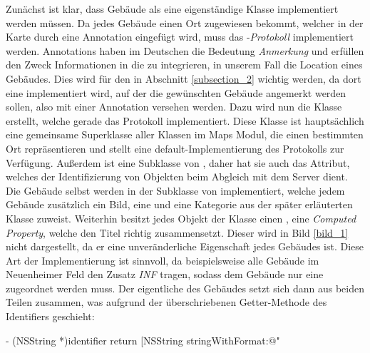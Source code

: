 \documentclass{report}
\begin{document}
Zunächst ist klar, dass Gebäude als eine eigenständige Klasse implementiert werden müssen. Da jedes Gebäude einen Ort zugewiesen bekommt, welcher in der Karte durch eine Annotation eingefügt wird, muss das -\emph{Protokoll} implementiert werden. Annotations haben im Deutschen die Bedeutung \emph{Anmerkung} und erfüllen den Zweck Informationen in die  zu integrieren, in unserem Fall die Location eines Gebäudes. Dies wird für den  in Abschnitt \ref{subsection_2} wichtig werden, da dort eine  implementiert wird, auf der die gewünschten Gebäude angemerkt werden sollen, also mit einer Annotation versehen werden. Dazu wird nun die Klasse  erstellt, welche gerade das  Protokoll implementiert. Diese Klasse ist hauptsächlich eine gemeinsame Superklasse aller Klassen im Maps Modul, die einen bestimmten Ort repräsentieren und stellt eine default-Implementierung des  Protokolls zur Verfügung. Außerdem ist  eine Subklasse von , daher hat sie auch das  Attribut, welches der Identifizierung von Objekten beim Abgleich mit dem Server dient. Die Gebäude selbst werden in der Subklasse  von  implementiert, welche jedem Gebäude zusätzlich ein Bild, eine  und eine Kategorie aus der später erläuterten Klasse  zuweist. Weiterhin besitzt jedes Objekt der Klasse einen , eine \emph{Computed Property}, welche den Titel richtig zusammensetzt. Dieser wird in Bild \ref{bild_1} nicht dargestellt, da er eine unveränderliche Eigenschaft jedes Gebäudes ist. Diese Art der Implementierung ist sinnvoll, da beispielsweise alle Gebäude im Neuenheimer Feld den Zusatz \emph{INF} tragen, sodass dem Gebäude nur eine  zugeordnet werden muss. Der eigentliche  des Gebäudes setzt sich dann aus beiden Teilen zusammen, was aufgrund der überschriebenen Getter-Methode des Identifiers geschieht:

\begin{objclst}
- (NSString *)identifier {
    return [NSString stringWithFormat:@"%
}
\end{objclst}
\end{document}
